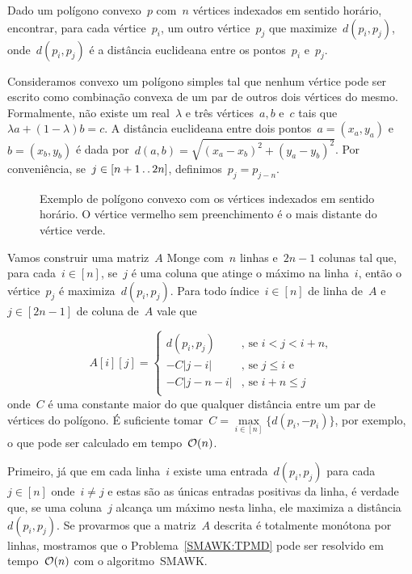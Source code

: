 \begin{prob} \label{SMAWK:TPMD}
Dado um polígono convexo~$p$ com~$n$ vértices indexados em sentido horário, encontrar, para cada vértice~$p_i$, um outro vértice~$p_j$ que maximize~$d(p_i,p_j)$, onde~$d(p_i,p_j)$ é a distância euclideana entre os pontos~$p_i$ e~$p_j$.
\end{prob}

Consideramos convexo um polígono simples tal que nenhum vértice pode ser escrito como combinação convexa de um par de outros dois vértices do mesmo. Formalmente, não existe um real~$\lambda$ e três vértices~$a,b$ e~$c$ tais que~$\lambda a + (1 - \lambda)b = c$. A distância euclideana entre dois pontos~${ a = (x_a,y_a) }$ e~${ b = (x_b,y_b) }$ é dada por~${ d(a,b) = \sqrt{ (x_a - x_b)^2 + (y_a - y_b)^2 } }$. Por conveniência, se~$j \in [n+1 \,.\,.\, 2n]$, definimos~$p_j = p_{j-n}$.

\begin{figure}[h]
    \centering
    
    \caption{Exemplo de polígono convexo com os vértices indexados em sentido horário. O vértice vermelho sem preenchimento é o mais distante do vértice verde.} \label{SMAWK:Polygon}
\end{figure}

Vamos construir uma matriz~$A$ Monge com~$n$ linhas e~$2n - 1$ colunas tal que, para cada~$i \in [n]$, se~$j$ é uma coluna que atinge o máximo na linha~$i$, então o vértice~$p_{j}$ é maximiza~$d(p_i,p_j)$. Para todo índice~$i \in [n]$ de linha de~$A$ e~$j \in [2n - 1]$ de coluna de~$A$ vale que

\begin{equation*}
A[i][j] = \begin{cases}
d(p_i,p_j) & \text{, se } i < j < i+n \text{,} \\
-C|j - i| & \text{, se } j \leq i \text{ e } \\
-C|j - n - i| & \text{, se } i + n \leq j \\
\end{cases}
\end{equation*}
onde~$C$ é uma constante maior do que qualquer distância entre um par de vértices do polígono. É suficiente tomar~$C = \max\limits_{i \in [n]}\{d(p_i,-p_i)\}$, por exemplo, o que pode ser calculado em tempo~$\mathcal{O}(n)$.

Primeiro, já que em cada linha~$i$ existe uma entrada~$d(p_i,p_j)$ para cada~$j \in [n]$ onde~$i \neq j$ e estas são as únicas entradas positivas da linha, é verdade que, se uma coluna~$j$ alcança um máximo nesta linha, ele maximiza a distância~$d(p_i,p_j)$. Se provarmos que a matriz~$A$ descrita é totalmente monótona por linhas, mostramos que o Problema~\ref{SMAWK:TPMD} pode ser resolvido em tempo~$\mathcal{O}(n)$ com o algoritmo~\textsc{SMAWK}.


